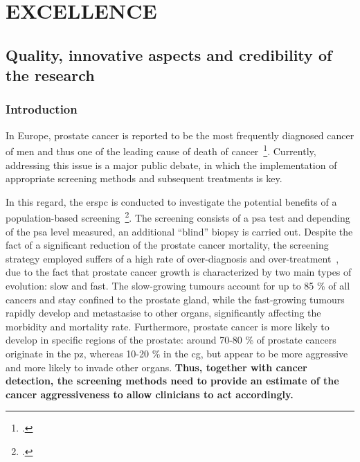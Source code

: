 \section{EXCELLENCE}
\label{sec:excellence}

\subsection{Quality, innovative aspects and credibility of the research}
\label{sec:quality}

\subsubsection{Introduction}

In Europe, prostate cancer is reported to be the most frequently diagnosed cancer of men and thus one of the leading cause of death of cancer~\footcite{Ferlay2013}. 
Currently, addressing this issue is a major public debate, in which the implementation of appropriate screening methods and subsequent treatments is key.

In this regard, the \ac{erspc} is conducted to investigate the potential benefits of a population-based screening~\footcite{Schroder2015}. 
The screening consists of a \ac{psa} test and depending of the \ac{psa} level measured, an additional ``blind'' biopsy is carried out. 
Despite the fact of a significant reduction of the prostate cancer mortality, the screening strategy employed suffers of a high rate of over-diagnosis and over-treatment~\cite{Delpierre2013,Schroder2015}, due to the fact that prostate cancer growth is characterized by two main types of evolution: slow and fast.
The slow-growing tumours account for up to 85 \% of all cancers and stay confined to the prostate gland, while the fast-growing tumours rapidly develop and metastasise to other organs, significantly affecting the morbidity and mortality rate.
Furthermore, prostate cancer is more likely to develop in specific regions of the prostate: around 70-80 \% of prostate cancers originate in the \ac{pz}, whereas 10-20 \% in the \ac{cg}, but appear to be more aggressive and more likely to invade other organs. 
\textbf{Thus, together with cancer detection, the screening methods need to provide an estimate of the cancer aggressiveness to allow clinicians to act accordingly.}


